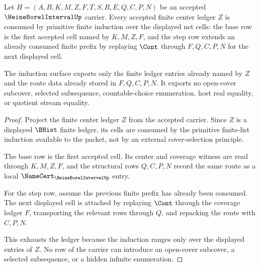 \begin{theorem}
\label{thm:heine-borel-interval-net-induction}
Let $H=(A,B,K,M,Z,F,T,S,R,E,Q,C,P,N)$ be an accepted $\HeineBorelIntervalUp$ carrier. Every accepted finite center ledger $Z$ is consumed by primitive finite induction over the displayed net cells: the base row is the first accepted cell named by $K,M,Z,F$, and the step row extends an already consumed finite prefix by replaying $\Cont$ through $F,Q,C,P,N$ for the next displayed cell.

The induction surface exports only the finite ledger entries already named by $Z$ and the route data already stored in $F,Q,C,P,N$. It exports no open-cover subcover, selected subsequence, countable-choice enumeration, host real equality, or quotient stream equality.
\end{theorem}
\begin{proof}
Project the finite center ledger $Z$ from the accepted carrier. Since $Z$ is a displayed $\BHist$ finite ledger, its cells are consumed by the primitive finite-list induction available to the packet, not by an external cover-selection principle.

The base row is the first accepted cell. Its center and coverage witness are read through $K,M,Z,F$, and the structural rows $Q,C,P,N$ record the same route as a local $\NameCert_{\HeineBorelIntervalUp}$ entry.

For the step row, assume the previous finite prefix has already been consumed. The next displayed cell is attached by replaying $\Cont$ through the coverage ledger $F$, transporting the relevant rows through $Q$, and repacking the route with $C,P,N$.

This exhausts the ledger because the induction ranges only over the displayed entries of $Z$. No row of the carrier can introduce an open-cover subcover, a selected subsequence, or a hidden infinite enumeration.
\end{proof}

